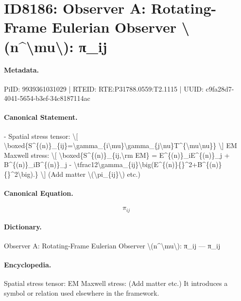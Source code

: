 \section*{ID8186: Observer A: Rotating-Frame Eulerian Observer \textbackslash{}(n\textasciicircum{}\textbackslash{}mu\textbackslash{}): π\_ij}
\paragraph{Metadata.}
PiID: 9939361031029 | RTEID: RTE:P31788.0559:T2.1115 | UUID: c9fa28d7-4041-5654-b3ef-34c8187114ac

\paragraph{Canonical Statement.}
- Spatial stress tensor: \textbackslash{}[ \textbackslash{}boxed\{S\textasciicircum{}\{(n)\}\_\{ij\}=\textbackslash{}gamma\_\{i\textbackslash{}mu\}\textbackslash{}gamma\_\{j\textbackslash{}nu\}T\textasciicircum{}\{\textbackslash{}mu\textbackslash{}nu\}\} \textbackslash{}] EM Maxwell stress: \textbackslash{}[ \textbackslash{}boxed\{S\textasciicircum{}\{(n)\}\_\{ij,\textbackslash{}rm EM\} = E\textasciicircum{}\{(n)\}\_iE\textasciicircum{}\{(n)\}\_j + B\textasciicircum{}\{(n)\}\_iB\textasciicircum{}\{(n)\}\_j - \textbackslash{}tfrac12\textbackslash{}gamma\_\{ij\}\textbackslash{}big(E\textasciicircum{}\{(n)\}\{\}\textasciicircum{}2+B\textasciicircum{}\{(n)\}\{\}\textasciicircum{}2\textbackslash{}big).\} \textbackslash{}] (Add matter \textbackslash{}(\textbackslash{}pi\_\{ij\}\textbackslash{}) etc.)

\paragraph{Canonical Equation.}
\[
\pi_{ij}
\]

\paragraph{Dictionary.}
Observer A: Rotating-Frame Eulerian Observer \textbackslash{}(n\textasciicircum{}\textbackslash{}mu\textbackslash{}): π\_ij — π\_ij

\paragraph{Encyclopedia.}
Spatial stress tensor: EM Maxwell stress: (Add matter etc.) It introduces a symbol or relation used elsewhere in the framework.

